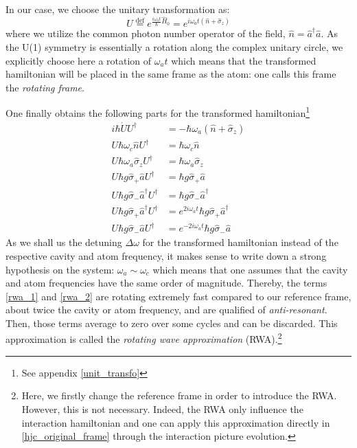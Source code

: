 \documentclass[10pt]{report}
\begin{document}
In our case, we choose the unitary transformation as:
\begin{equation}
\label{unitary_trans_def}
U \stackrel{\text{def}}{=} e^{\frac{i\omega_at}{\hbar}\hat{H}_0} = e^{i\omega_at(\hat{n} + \hat{\sigma}_z)}
\end{equation}
where we utilize the common photon number operator of the field, $\hat{n} = \hat{a}^{\dag}\hat{a}$. As the U(1) symmetry is essentially a rotation along the complex unitary circle, we explicitly choose here a rotation of $\omega_at$ which means that the transformed hamiltonian will be placed in the same frame as the atom: one calls this frame the \textit{rotating frame}.

One finally obtains the following parts for the transformed hamiltonian\footnote{See appendix \ref{unit_transfo}}
\begin{align}
i\hbar \dot{U} U^{\dag} &= -\hbar\omega_a(\hat{n} + \hat{\sigma}_z)\\
U\hbar \omega_c\hat{n} U^{\dag} &= \hbar\omega_c\hat{n}\\
U\hbar \omega_a\hat{\sigma}_z U^{\dag} &= \hbar\omega_a\hat{\sigma}_z\\
U\hbar g\hat{\sigma}_+\hat{a} U^{\dag} &= \hbar g\hat{\sigma}_+\hat{a}\\
U\hbar g\hat{\sigma}_-\hat{a}^{\dag} U^{\dag} &= \hbar g\hat{\sigma}_-\hat{a}^{\dag}\\
\label{rwa_1}
U\hbar g\hat{\sigma}_+\hat{a}^{\dag} U^{\dag} &= e^{2i\omega_at}\hbar g\hat{\sigma}_+\hat{a}^{\dag}\\
\label{rwa_2}
U\hbar g\hat{\sigma}_-\hat{a} U^{\dag} &= e^{-2i\omega_at}\hbar g\hat{\sigma}_-\hat{a}
\end{align}
As we shall us the detuning $\Delta\omega$ for the transformed hamiltonian instead of the respective cavity and atom frequency, it makes sense to write down a strong hypothesis on the system: $\omega_a \sim \omega_c$ which means that one assumes that the cavity and atom frequencies have the same order of magnitude. Thereby, the terms \eqref{rwa_1} and \eqref{rwa_2} are rotating extremely fast compared to our reference frame, about twice the cavity or atom frequency, and are qualified of \textit{anti-resonant}. Then, those terms average to zero over some cycles and can be discarded. This approximation is called the \textit{rotating wave approximation} (RWA).\footnote{Here, we firstly change the reference frame in order to introduce the RWA. However, this is not necessary. Indeed, the RWA only influence the interaction hamiltonian and one can apply this approximation directly in \eqref{hjc_original_frame} through the interaction picture evolution.}
\end{document}
